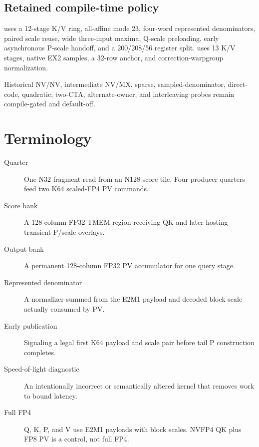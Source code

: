 \subsection{Retained compile-time policy}

 uses a 12-stage K/V ring, all-affine mode 23, four-word
represented denominators, paired scale reuse, wide three-input maxima,
Q-scale preloading, early asynchronous P-scale handoff, and a 200/208/56
register split.  uses 13 K/V stages, native EX2 samples, a
32-row anchor, and correction-warpgroup normalization.

Historical NV/NV, intermediate NV/MX, sparse, sampled-denominator,
direct-code, quadratic, two-CTA, alternate-owner, and interleaving probes
remain compile-gated and default-off.

\section{Terminology}

\begin{description}
  \item[Quarter] One N32 fragment read from an N128 score tile. Four producer
  quarters feed two K64 scaled-FP4 PV commands.
  \item[Score bank] A 128-column FP32 TMEM region receiving QK and later
  hosting transient P/scale overlays.
  \item[Output bank] A permanent 128-column FP32 PV accumulator for one query
  stage.
  \item[Represented denominator] A normalizer summed from the E2M1 payload
  and decoded block scale actually consumed by PV.
  \item[Early publication] Signaling a legal first K64 payload and scale pair
  before tail P construction completes.
  \item[Speed-of-light diagnostic] An intentionally incorrect or
  semantically altered kernel that removes work to bound latency.
  \item[Full FP4] Q, K, P, and V use E2M1 payloads with block scales. NVFP4
  QK plus FP8 PV is a control, not full FP4.
\end{description}
